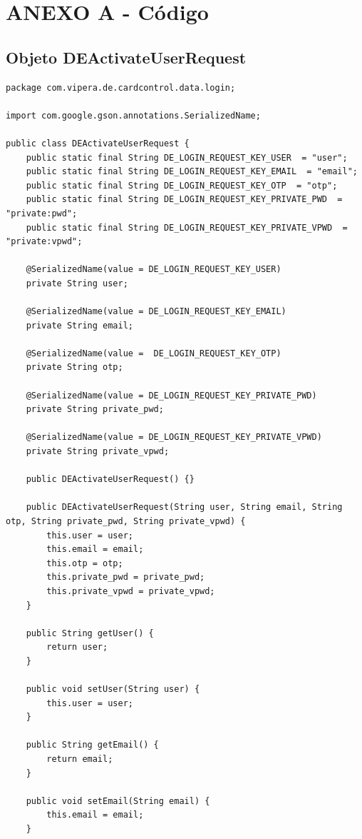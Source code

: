 \documentclass[a4paper, 12pt]{article}
\newenvironment{code}{\captionsetup{type=listing}}{}
\begin{document}
\section{ANEXO A - Código}
\label{sec-6}
\subsection{Objeto DEActivateUserRequest}
\label{sec-6-1}
\begin{code}
\label{code:android-json}
\begin{verbatim}
package com.vipera.de.cardcontrol.data.login;

import com.google.gson.annotations.SerializedName;

public class DEActivateUserRequest {
    public static final String DE_LOGIN_REQUEST_KEY_USER  = "user";
    public static final String DE_LOGIN_REQUEST_KEY_EMAIL  = "email";
    public static final String DE_LOGIN_REQUEST_KEY_OTP  = "otp";
    public static final String DE_LOGIN_REQUEST_KEY_PRIVATE_PWD  = "private:pwd";
    public static final String DE_LOGIN_REQUEST_KEY_PRIVATE_VPWD  = "private:vpwd";

    @SerializedName(value = DE_LOGIN_REQUEST_KEY_USER)
    private String user;

    @SerializedName(value = DE_LOGIN_REQUEST_KEY_EMAIL)
    private String email;

    @SerializedName(value =  DE_LOGIN_REQUEST_KEY_OTP)
    private String otp;

    @SerializedName(value = DE_LOGIN_REQUEST_KEY_PRIVATE_PWD)
    private String private_pwd;

    @SerializedName(value = DE_LOGIN_REQUEST_KEY_PRIVATE_VPWD)
    private String private_vpwd;

    public DEActivateUserRequest() {}

    public DEActivateUserRequest(String user, String email, String otp, String private_pwd, String private_vpwd) {
        this.user = user;
        this.email = email;
        this.otp = otp;
        this.private_pwd = private_pwd;
        this.private_vpwd = private_vpwd;
    }

    public String getUser() {
        return user;
    }

    public void setUser(String user) {
        this.user = user;
    }

    public String getEmail() {
        return email;
    }

    public void setEmail(String email) {
        this.email = email;
    }


\end{verbatim}
\end{code}
\end{document}
